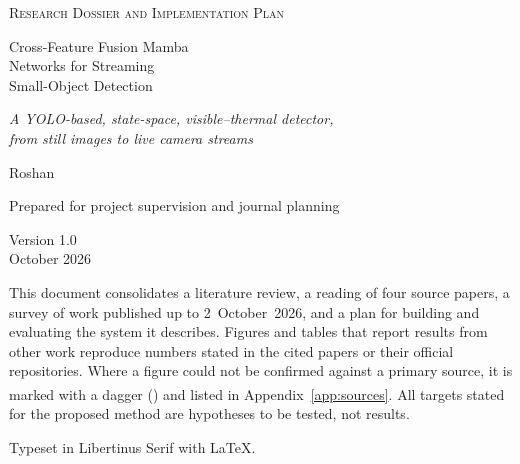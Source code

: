 \begin{titlepage}
\thispagestyle{empty}
\centering

\vspace*{30mm}

{\large\scshape\color{muted} Research Dossier and Implementation Plan\par}

\vspace{20mm}

{\fontsize{29}{37}\selectfont Cross-Feature Fusion Mamba\\[2pt]
 Networks for Streaming\\[2pt]
 Small-Object Detection\par}

\vspace{14mm}

{\Large\itshape A YOLO-based, state-space, visible--thermal detector,\\[2pt]
 from still images to live camera streams\par}

\vspace{30mm}

{\large Roshan\par}

\vspace{4mm}

{\normalsize\color{muted} Prepared for project supervision and journal planning\par}

\vfill

{\normalsize\color{muted}
Version 1.0\\[2pt]
October 2026\par}

\vspace{12mm}
\end{titlepage}

\thispagestyle{empty}
\vspace*{\fill}
\begin{minipage}{\textwidth}
\small\color{muted}
This document consolidates a literature review, a reading of four source
papers, a survey of work published up to 2~October~2026, and a plan for
building and evaluating the system it describes. Figures and tables
that report results from other work reproduce numbers stated in the
cited papers or their official repositories. Where a figure could not be
confirmed against a primary source, it is marked with a dagger
(\textsuperscript{\dag}) and listed in Appendix~\ref{app:sources}. All
targets stated for the proposed method are hypotheses to be tested, not
results.

\vspace{6mm}

Typeset in Libertinus Serif with \LaTeX.
\end{minipage}
\vspace{18mm}
\clearpage
